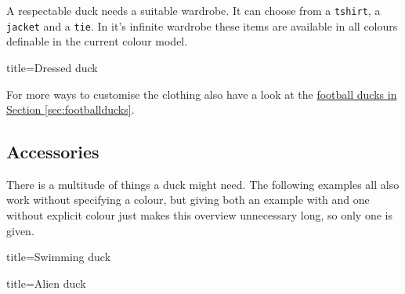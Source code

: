 \documentclass[parskip=half]{scrartcl}
\begin{document}
A respectable duck needs a suitable wardrobe. It can choose from a \lstinline|tshirt|, a \lstinline|jacket| and a \lstinline|tie|. In it's infinite wardrobe these items are available in all colours definable in the current colour model.

\begin{tcblisting}{title={Dressed duck}}
\begin{tikzpicture}
	\duck[tshirt]
\end{tikzpicture}
\begin{tikzpicture}
	\duck[jacket]
\end{tikzpicture}

\begin{tikzpicture}
	\duck[tie]
\end{tikzpicture}
\begin{tikzpicture}
	\duck[cape]
\end{tikzpicture}

\begin{tikzpicture}
	\duck[tshirt=lightgray, 
			jacket=blue!50!black, 
			tie=blue!80!black, 
			shorthair]
\end{tikzpicture}
\end{tcblisting}

For more ways to customise the clothing also have a look at the \hyperref[sec:footballducks]{football ducks in Section \ref{sec:footballducks}}.

\clearpage
\subsection{Accessories}
\label{sec:accessories}

There is a multitude of things a duck might need. The following examples all also work without specifying a colour, but giving both an example with and one without explicit colour just makes this overview unnecessary long, so only one is given.

\begin{tcblisting}{title={Swimming duck}}
\begin{tikzpicture}
	\duck[water=cyan!50!blue]
\end{tikzpicture}
\end{tcblisting}

\begin{tcblisting}{title={Alien duck}}
\begin{tikzpicture}
	\duck[alien=green!50!brown]
\end{tikzpicture}
\end{tcblisting}
\end{document}
